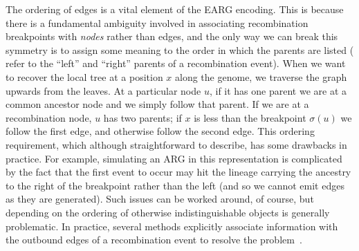 \documentclass{article}
\begin{document}

The ordering of edges is a vital element of the EARG encoding.
This is because there is a fundamental ambiguity involved
in associating recombination breakpoints with \emph{nodes}
rather than edges,
and the only way we can break this symmetry is to assign
some meaning to the order in which the parents are listed
(\cite{griffiths1997ancestral} refer to the ``left'' and ``right''
parents of a recombination event). When we want to recover
the local tree at a position $x$ along the genome,
we traverse the graph upwards from the leaves. At a particular
node $u$, if it has one parent we are at a common ancestor
node and we simply follow that parent. If we are at a
recombination node, $u$ has two parents; if
$x$ is less than the breakpoint $\sigma(u)$ we follow
the first edge, and otherwise follow the second edge.
This ordering requirement, which although straightforward
to describe, has some drawbacks in practice. For example,
simulating an ARG in this representation is
complicated by the fact that the
first event to occur may hit the lineage carrying the ancestry
to the right of the breakpoint rather
than the left (and so we cannot emit edges as they are generated).
Such issues can be worked around, of course,
but depending on the ordering of otherwise indistinguishable
objects is generally problematic. In practice, several
methods
explicitly associate information with the outbound edges
of a recombination event
to resolve the problem~\citep{lyngso2005minimum,ignatieva2021kwarg}.
\end{document}
